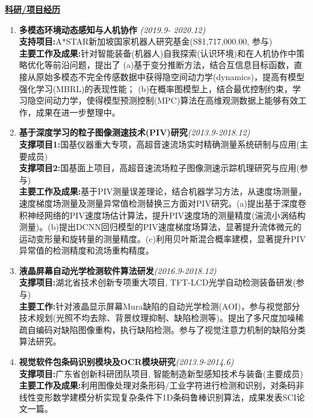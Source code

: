 \documentclass[a4paper,fontsize=11pt]{scrartcl} %
\newcommand{\stitle}[1]{
	\noindent\underline{\textbf{#1}} \normalsize\par}
\begin{document}
\stitle{科研/项目经历}
\begin{enumerate}
	\setlength\itemsep{0.0cm}
	\item \textbf{多模态环境动态感知与人机协作} \hfill \textit{(2019.9- 2020.12)}\\
	\textbf{支持项目:}A*STAR新加坡国家机器人研究基金(S\$1,717,000.00, 参与)\\
    \textbf{主要工作及成果:}针对智能装备(机器人)自我探索(认识环境)和在人机协作中策略优化等前沿问题，提出了
	(a)基于变分推断方法，结合互信息目标函数，直接从原始多模态不完全传感数据中获得隐空间动力学(dynamics)，提高有模型强化学习(MBRL)的表现性能；
    (b)在概率图模型上，结合最优控制约束，学习隐空间动力学，使得模型预测控制(MPC)算法在高维观测数据上能够有效工作，成果在进一步整理中。
    \item \textbf{基于深度学习的粒子图像测速技术(PIV)研究}\hfill \textit{(2013.9-2018.12)}\\
	\textbf{支撑项目1:}国基仪器重大专项，高超音速流场实时精确测量系统研制与应用(主要成员)\\
	\textbf{支撑项目2:}国基面上项目，高超音速流场粒子图像测速示踪机理研究与应用(参与)\\
	\textbf{主要工作及成果:}基于PIV测量误差理论，结合机器学习方法，从速度场测量，速度梯度场测量及测量异常值检测替换三方面对PIV研究。(a)提出基于深度卷积神经网络的PIV速度场估计算法，提升PIV速度场的测量精度(湍流小涡结构测量)。(b)提出DCNN回归模型的PIV速度梯度场算法，显著提升流体微元的运动变形量和旋转量的测量精度。(c)利用贝叶斯混合概率建模，显著提升PIV异常值的检测精度和流场重构精度。
\item \textbf{液晶屏幕自动光学检测软件算法研发}\hfill	\textit{(2016.9-2018.12)}\\
\textbf{支撑项目:}湖北省技术创新专项重大项目, TFT-LCD光学自动检测装备研发(参与)\\
\textbf{主要工作:}针对液晶显示屏幕Mura缺陷的自动光学检测(AOI)，参与视觉部分技术规划(光照不均去除、背景纹理抑制、缺陷检测等)。提出了多尺度加噪稀疏自编码对缺陷图像重构，执行缺陷检测。参与了视觉注意力机制的缺陷分类算法研究。
\item \textbf{视觉软件包条码识别模块及OCR模块研究}\hfill \textit{(2013.9-2014.6)}\\
\textbf{支撑项目:}广东省创新科研团队项目, 智能制造新型感知技术与装备(主要成员)\\
\textbf{主要工作及成果:}利用图像处理对条形码/工业字符进行检测和识别，对条码非线性变形数学建模分析实现复杂条件下1D条码鲁棒识别算法，成果发表SCI论文一篇。
\end{enumerate}
\end{document}

